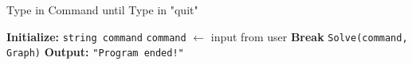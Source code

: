 \begin{algorithm}
    \caption{Type in Command until Type in "quit"}
    \begin{algorithmic}[1]
    \State \textbf{Initialize:} \texttt{string command}
        \State \quad \texttt{command} $\gets$ input from user
            \State \quad \textbf{Break}
        \Else
            \State \quad \texttt{Solve(command, Graph)}
        \EndIf
    \EndWhile
    \State \textbf{Output:} \texttt{"Program ended!"}
    \end{algorithmic}
\end{algorithm}
